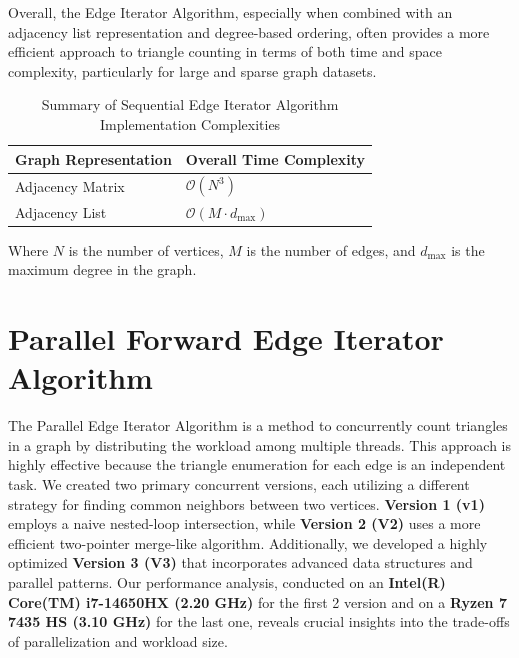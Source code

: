 \documentclass{aes2e}
\begin{document}
Overall, the Edge Iterator Algorithm, especially when combined with an adjacency list representation and degree-based ordering, often provides a more efficient approach to triangle counting in terms of both time and space complexity, particularly for large and sparse graph datasets.

\begin{table}[htbp]
    \centering
    \caption{Summary of Sequential Edge Iterator Algorithm Implementation Complexities}
    \label{tab:edge_complexity_summary}
    \begin{tabular}{|l|l|}
        \hline
        \textbf{Graph Representation} & \textbf{Overall Time Complexity} \\
        \hline
        Adjacency Matrix & $\mathcal{O}(N^3)$ \\
        Adjacency List & $\mathcal{O}(M \cdot d_{\text{max}})$ \\
        \hline
    \end{tabular}
    \vspace{0.5em}
    \small
    Where $N$ is the number of vertices, $M$ is the number of edges, and $d_{\text{max}}$ is the maximum degree in the graph.
\end{table}


\section{Parallel Forward Edge Iterator Algorithm}
The Parallel Edge Iterator Algorithm is a method to concurrently count triangles in a graph by distributing the workload among multiple threads. This approach is highly effective because the triangle enumeration for each edge is an independent task. We created two primary concurrent versions, each utilizing a different strategy for finding common neighbors between two vertices. \textbf{Version 1 (v1)} employs a naive nested-loop intersection, while \textbf{Version 2 (V2)} uses a more efficient two-pointer merge-like algorithm. Additionally, we developed a highly optimized \textbf{Version 3 (V3)} that incorporates advanced data structures and parallel patterns. Our performance analysis, conducted on an \textbf{Intel(R) Core(TM) i7-14650HX (2.20 GHz)} for the first 2 version and on a \textbf{Ryzen 7 7435 HS (3.10 GHz)} for the last one, reveals crucial insights into the trade-offs of parallelization and workload size.
\end{document}
